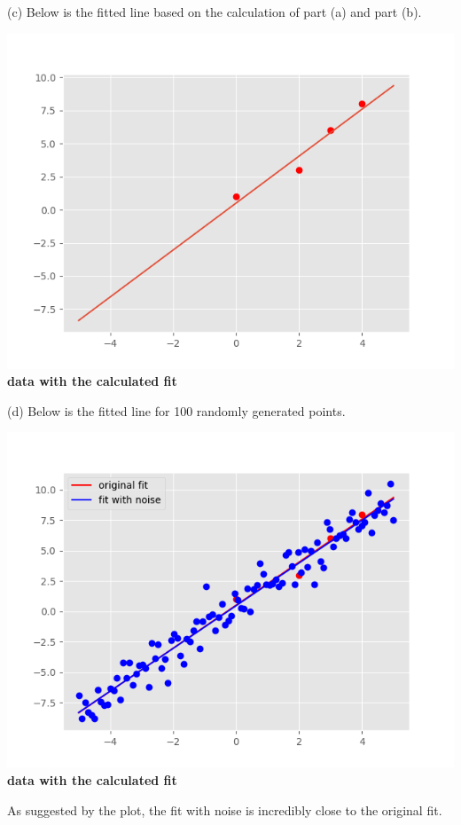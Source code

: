 \documentclass[12pt,letterpaper]{hmcpset}
\begin{document}
\begin{solution}
(c) Below is the fitted line based on the calculation of part (a) and part (b).
\begin{center}
\includegraphics[scale = .8]{hw1pr2c.png}\\
\textbf{data with the calculated fit}
\end{center}

(d) Below is the fitted line for 100 randomly generated points.
\begin{center}
\includegraphics[scale = .8]{hw1pr2d.png}\\
\textbf{data with the calculated fit}
\end{center}
As suggested by the plot, the fit with noise is incredibly close to the original fit.
\end{solution}
\newpage
\end{document}
